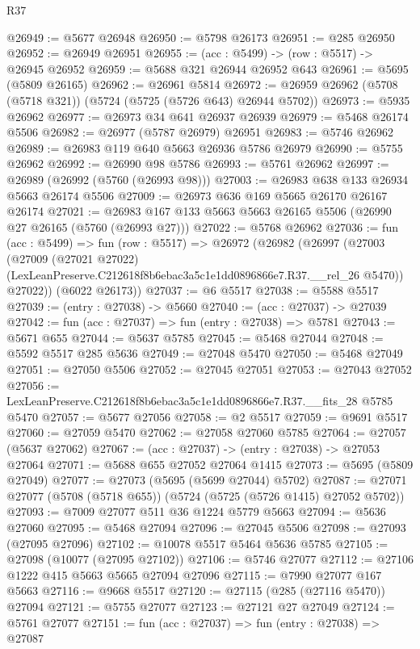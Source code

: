 \begin{lexlean}{R37}
\begin{coremodule}
@26949 := @5677 @26948
@26950 := @5798 @26173
@26951 := @285 @26950
@26952 := @26949 @26951
@26955 := (acc : @5499) -> (row : @5517) -> @26945 @26952
@26959 := @5688 @321 @26944 @26952 @643
@26961 := @5695 (@5809 @26165)
@26962 := @26961 @5814
@26972 := @26959 @26962 (@5708 (@5718 @321)) (@5724 (@5725 (@5726 @643) @26944 @5702))
@26973 := @5935 @26962
@26977 := @26973 @34 @641 @26937 @26939
@26979 := @5468 @26174 @5506
@26982 := @26977 (@5787 @26979) @26951
@26983 := @5746 @26962
@26989 := @26983 @119 @640 @5663 @26936 @5786 @26979
@26990 := @5755 @26962
@26992 := @26990 @98 @5786
@26993 := @5761 @26962
@26997 := @26989 (@26992 (@5760 (@26993 @98)))
@27003 := @26983 @638 @133 @26934 @5663 @26174 @5506
@27009 := @26973 @636 @169 @5665 @26170 @26167 @26174
@27021 := @26983 @167 @133 @5663 @5663 @26165 @5506 (@26990 @27 @26165 (@5760 (@26993 @27)))
@27022 := @5768 @26962
@27036 := fun (acc : @5499) =>
  fun (row : @5517) =>
  @26972
    (@26982
      (@26997
        (@27003
          (@27009
            (@27021 @27022)
            (LexLeanPreserve.C212618f8b6ebac3a5c1e1dd0896866e7.R37.__rel_26 @5470))
          @27022))
      (@6022 @26173))
@27037 := @6 @5517
@27038 := @5588 @5517
@27039 := (entry : @27038) -> @5660
@27040 := (acc : @27037) -> @27039
@27042 := fun (acc : @27037) => fun (entry : @27038) => @5781
@27043 := @5671 @655
@27044 := @5637 @5785
@27045 := @5468 @27044
@27048 := @5592 @5517 @285 @5636
@27049 := @27048 @5470
@27050 := @5468 @27049
@27051 := @27050 @5506
@27052 := @27045 @27051
@27053 := @27043 @27052
@27056 := LexLeanPreserve.C212618f8b6ebac3a5c1e1dd0896866e7.R37.__fits_28 @5785 @5470
@27057 := @5677 @27056
@27058 := @2 @5517
@27059 := @9691 @5517
@27060 := @27059 @5470
@27062 := @27058 @27060 @5785
@27064 := @27057 (@5637 @27062)
@27067 := (acc : @27037) -> (entry : @27038) -> @27053 @27064
@27071 := @5688 @655 @27052 @27064 @1415
@27073 := @5695 (@5809 @27049)
@27077 := @27073 (@5695 (@5699 @27044) @5702)
@27087 := @27071 @27077 (@5708 (@5718 @655)) (@5724 (@5725 (@5726 @1415) @27052 @5702))
@27093 := @7009 @27077 @511 @36 @1224 @5779 @5663
@27094 := @5636 @27060
@27095 := @5468 @27094
@27096 := @27045 @5506
@27098 := @27093 (@27095 @27096)
@27102 := @10078 @5517 @5464 @5636 @5785
@27105 := @27098 (@10077 (@27095 @27102))
@27106 := @5746 @27077
@27112 := @27106 @1222 @415 @5663 @5665 @27094 @27096
@27115 := @7990 @27077 @167 @5663
@27116 := @9668 @5517
@27120 := @27115 (@285 (@27116 @5470)) @27094
@27121 := @5755 @27077
@27123 := @27121 @27 @27049
@27124 := @5761 @27077
@27151 := fun (acc : @27037) =>
  fun (entry : @27038) =>
  @27087

\end{coremodule}
\end{lexlean}

